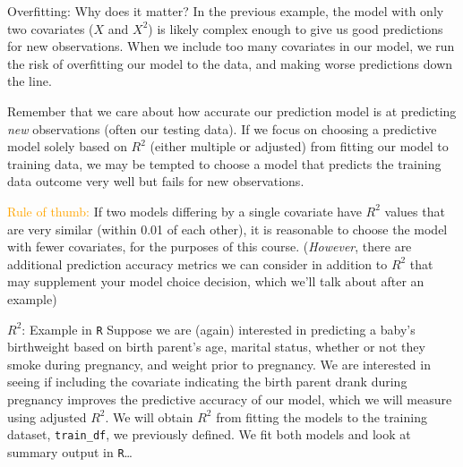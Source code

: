\documentclass[10pt,t]{beamer}
\begin{document}
\begin{frame}{Overfitting: Why does it matter?}
In the previous example, the model with only two covariates ($X$ and $X^2$) is likely complex enough to give us good predictions for new observations. When we include too many covariates in our model, we run the risk of overfitting our model to the data, and making worse predictions down the line.

\vspace{0.3cm}

Remember that we care about how accurate our prediction model is at predicting \textit{new} observations (often our testing data). If we focus on choosing a predictive model solely based on $R^2$ (either multiple or adjusted) from fitting our model to training data, we may be tempted to choose a model that predicts the training data outcome very well but fails for new observations.

\vspace{0.3cm}

\textcolor{orange}{Rule of thumb:} If two models differing by a single covariate have $R^2$ values that are very similar (within 0.01 of each other), it is reasonable to choose the model with fewer covariates, for the purposes of this course. \small (\textit{However}, there are additional prediction accuracy metrics we can consider in addition to $R^2$ that may supplement your model choice decision, which we'll talk about after an example)
\end{frame}

\begin{frame}{$R^2$: Example in \texttt{R}}
Suppose we are (again) interested in predicting a baby's birthweight based on birth parent's age, marital status, whether or not they smoke during pregnancy, and weight prior to pregnancy. We are interested in seeing if including the covariate indicating the birth parent drank during pregnancy improves the predictive accuracy of our model, which we will measure using adjusted $R^2$. We will obtain $R^2$ from fitting the models to the training dataset, \texttt{train\_df}, we previously defined. We fit both models and look at summary output in \texttt{R}\dots


\end{frame}
\end{document}
